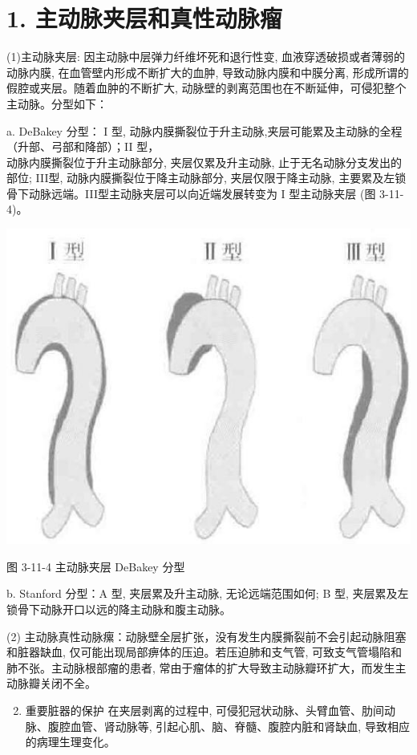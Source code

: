 \documentclass[10pt]{article}
\begin{document}
\section*{1. 主动脉夹层和真性动脉瘤}
(1)主动脉夹层: 因主动脉中层弹力纤维坏死和退行性变, 血液穿透破损或者薄弱的动脉内膜, 在血管壁内形成不断扩大的血肿, 导致动脉内膜和中膜分离, 形成所谓的假腔或夹层。随着血肿的不断扩大, 动脉壁的剥离范围也在不断延伸，可侵犯整个主动脉。分型如下：

a. DeBakey 分型： I 型, 动脉内膜撕裂位于升主动脉,夹层可能累及主动脉的全程（升部、弓部和降部）；II 型，\\
动脉内膜撕裂位于升主动脉部分, 夹层仅累及升主动脉, 止于无名动脉分支发出的部位; III型, 动脉内膜撕裂位于降主动脉部分, 夹层仅限于降主动脉, 主要累及左锁骨下动脉远端。III型主动脉夹层可以向近端发展转变为 I 型主动脉夹层 (图 3-11-4)。

\begin{center}
\includegraphics[max width=\textwidth]{2024_07_05_645bb794a4d4f32ee0c8g-244}
\end{center}

图 3-11-4 主动脉夹层 DeBakey 分型

b. Stanford 分型：A 型, 夹层累及升主动脉, 无论远端范围如何; B 型, 夹层累及左锁骨下动脉开口以远的降主动脉和腹主动脉。

(2) 主动脉真性动脉瘰：动脉壁全层扩张，没有发生内膜撕裂前不会引起动脉阻塞和脏器缺血, 仅可能出现局部痹体的压迫。若压迫肺和支气管, 可致支气管塌陷和肺不张。主动脉根部瘤的患者, 常由于瘤体的扩大导致主动脉瓣环扩大，而发生主动脉瓣关闭不全。

\begin{enumerate}
  \setcounter{enumi}{1}
  \item 重要脏器的保护 在夹层剥离的过程中, 可侵犯冠状动脉、头臂血管、肋间动脉、腹腔血管、肾动脉等, 引起心肌、脑、脊髓、腹腔内脏和肾缺血, 导致相应的病理生理变化。
\end{enumerate}
\end{document}
